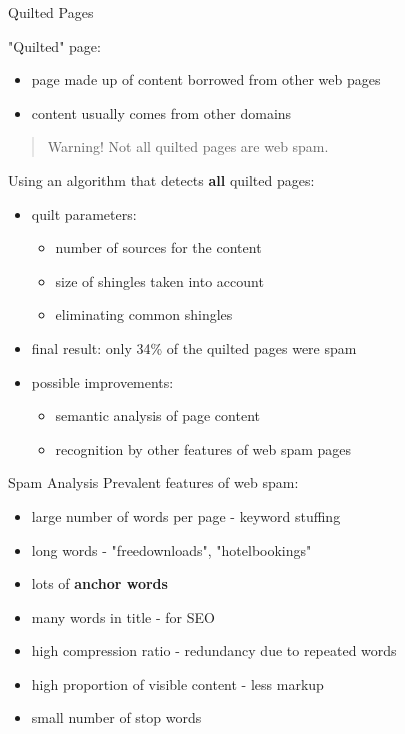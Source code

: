 \begin{frame}{Quilted Pages}

"Quilted" page:
\begin{itemize}
	\item page made up of content borrowed from other web pages
	\item content usually comes from other domains
\end{itemize}

\begin{quote}
	Warning! Not all quilted pages are web spam.
\end{quote}

Using an algorithm that detects \textbf{all} quilted pages:
\begin{itemize}

\item quilt parameters:
\begin{itemize}
	\item number of sources for the content
	\item size of shingles taken into account
	\item eliminating common shingles
\end{itemize}

\item final result: only 34\% of the quilted pages were spam 

\item possible improvements:
\begin{itemize}
	\item semantic analysis of page content
	\item recognition by other features of web spam pages
\end{itemize}

\end{itemize}

\end{frame}

\begin{frame}{Spam Analysis}
Prevalent features of web spam:
\begin{itemize}
	\item large number of words per page - keyword stuffing
	\item long words - "freedownloads", "hotelbookings"
	\item lots of \textbf{anchor words}
	\item many words in title - for SEO %
	\item high compression ratio - redundancy due to repeated words %
	\item high proportion of visible content - less markup  %
	\item small number of stop words %
\end{itemize}
\end{frame}

